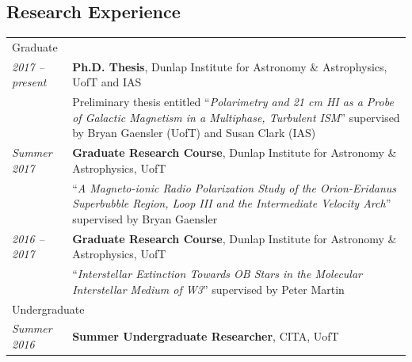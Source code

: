 \documentclass[10pt]{res} %
\begin{document}
\begin{resume}

\section{\Large Research Experience}
\vspace{-5pt} %
\noindent\makebox[\linewidth]{\rule{\textwidth}{0.4pt}}
\vspace{-20pt} %

\begin{table}[h]
\begin{tabularx}{\textwidth}{ @{} p{6.5em} X @{} }
\multicolumn{2}{l}{ \rule{0pt}{3ex} \large \hspace{-12pt} Graduate \dotfill \rule[-1.2ex]{0pt}{0pt}} \\
\textit{2017 -- present} & \textbf{Ph.D. Thesis}, Dunlap Institute for Astronomy \& Astrophysics, UofT and IAS \\
                                    & Preliminary thesis entitled ``\textit{Polarimetry and 21 cm HI as a Probe of Galactic Magnetism in a Multiphase, Turbulent ISM}'' supervised by Bryan Gaensler (UofT) and Susan Clark (IAS) \\
\textit{Summer 2017} & \textbf{Graduate Research Course}, Dunlap Institute for Astronomy \& Astrophysics, UofT \\
                                   & ``\textit{A Magneto-ionic Radio Polarization Study of the Orion-Eridanus Superbubble Region, Loop III and the Intermediate Velocity Arch}'' supervised by Bryan Gaensler \\
\textit{2016 -- 2017} & \textbf{Graduate Research Course}, Dunlap Institute for Astronomy \& Astrophysics, UofT  \\
                                 & ``\textit{Interstellar Extinction Towards OB Stars in the Molecular Interstellar Medium of W3}'' supervised by Peter Martin \\
\multicolumn{2}{l}{ \rule{0pt}{6.5ex} \large \hspace{-12pt} Undergraduate \dotfill \rule[-1.2ex]{0pt}{0pt}} \\
\textit{Summer 2016} & \textbf{Summer Undergraduate Researcher}, CITA, UofT \\

\end{tabularx}
\end{table}
\end{resume}
\end{document}

